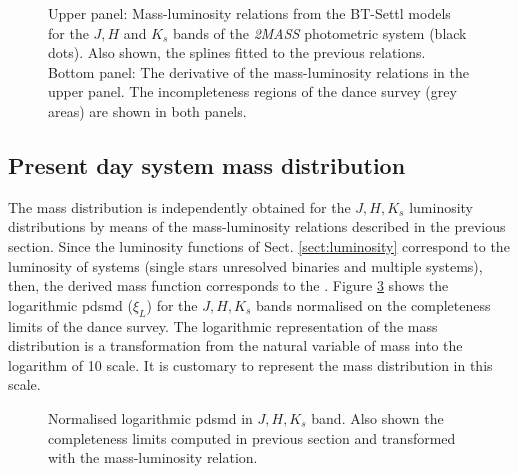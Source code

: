 \begin{figure}[ht!]
\begin{subfigure}[t]{0.7\textwidth}
        \caption{}
        \label{fig:der_splineML}
    \end{subfigure}
\caption{Upper panel: Mass-luminosity relations from the BT-Settl models \citep{Allard2012} for the $J, H$ and $K_s$ bands of the \emph{2MASS} photometric system (black dots). Also shown, the splines fitted to the previous relations. Bottom panel: The derivative of the mass-luminosity relations in the upper panel. The incompleteness regions of the \gls{dance} survey (grey areas) are shown in both panels.}
\label{fig:ML}
\end{figure}

\subsection{Present day system mass distribution}

The mass distribution is independently obtained for the $J,H,K_s$ luminosity distributions by means of the mass-luminosity relations described in the previous section. Since the luminosity functions of Sect. \ref{sect:luminosity} correspond to the luminosity of systems (single stars unresolved binaries and multiple systems), then, the derived mass function corresponds to the .  Figure \ref{fig:MassDistribution} shows the logarithmic \gls{pdsmd} ($\xi_L$) for the $J,H,K_s$ bands normalised on the completeness limits of the \gls{dance} survey. The logarithmic representation of the mass distribution is a transformation from the natural variable of mass into the logarithm of 10 scale. It is customary to represent the mass distribution in this scale.

\begin{figure}[htbp]
\begin{center}
\caption{Normalised logarithmic \gls{pdsmd} in $J,H,K_s$ band. Also shown the completeness limits computed in previous section and transformed with the mass-luminosity relation.}
\label{fig:MassDistribution}
\end{center}
\end{figure}

